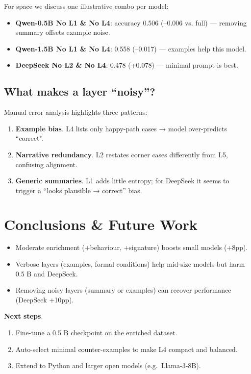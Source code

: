 \documentclass[a4paper]{usiinfbachelorproject}
\begin{document}
For space we discuss one illustrative combo per model:

\begin{itemize}[leftmargin=12pt]
  \item \textbf{Qwen-0.5B No L1 \& No L4}: accuracy 0.506 (–0.006 vs. full) — removing summary offsets example noise.  
  \item \textbf{Qwen-1.5B No L1 \& No L4}: 0.558 (–0.017) — examples help this model.  
  \item \textbf{DeepSeek No L2 \& No L4}: 0.478 (+0.078) — minimal prompt is best.  
\end{itemize}

\subsection{What makes a layer “noisy”?}
Manual error analysis highlights three patterns:

\begin{enumerate}[label=\alph*),leftmargin=15pt,itemsep=0pt]
  \item \textbf{Example bias}.  L4 lists only happy-path cases → model over-predicts “correct”.  
  \item \textbf{Narrative redundancy}.  L2 restates corner cases differently from L5, confusing alignment.  
  \item \textbf{Generic summaries}.  L1 adds little entropy; for DeepSeek it seems to trigger a “looks plausible → correct” bias.
\end{enumerate}

\section{Conclusions \& Future Work}\label{sec:concl}

\begin{itemize}[leftmargin=12pt]
  \item Moderate enrichment (+behaviour, +signature) boosts small models (+8pp).  
  \item Verbose layers (examples, formal conditions) help mid-size models but harm 0.5 B and DeepSeek.  
  \item Removing noisy layers (summary or examples) can recover performance (DeepSeek +10pp).  
\end{itemize}

\textbf{Next steps}.  
\begin{enumerate}[label=\arabic*.]
  \item Fine-tune a 0.5 B checkpoint on the enriched dataset.  
  \item Auto-select minimal counter-examples to make L4 compact and balanced.  
  \item Extend to Python and larger open models (e.g.\ Llama-3-8B).  
\end{enumerate}



\end{document}
